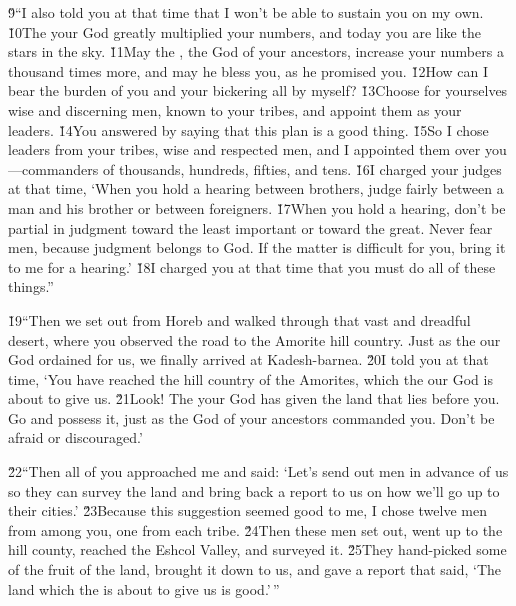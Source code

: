 \v{9}``I also told you at that time that I won't be able to sustain you on my own. \v{10}The  your God greatly multiplied your numbers, and today you are like the stars in the sky. \v{11}May the , the God of your ancestors, increase your numbers a thousand times more, and may he bless you, as he promised you. \v{12}How can I bear the burden of you and your bickering all by myself? \v{13}Choose for yourselves wise and discerning men, known to your tribes, and appoint them as your leaders. \v{14}You answered by saying that this plan is a good thing. \v{15}So I chose leaders from your tribes, wise and respected men, and I appointed them over you---commanders of thousands, hundreds, fifties, and tens. \v{16}I charged your judges at that time, `When you hold a hearing between brothers, judge fairly between a man and his brother or between foreigners. \v{17}When you hold a hearing, don't be partial in judgment toward the least important or toward the great. Never fear men, because judgment belongs to God. If the matter is difficult for you, bring it to me for a hearing.' \v{18}I charged you at that time that you must do all of these things.''

\v{19}``Then we set out from Horeb and walked through that vast and dreadful desert, where you observed the road to the Amorite hill country. Just as the  our God ordained for us, we finally arrived at Kadesh-barnea. \v{20}I told you at that time, `You have reached the hill country of the Amorites, which the  our God is about to give us. \v{21}Look! The  your God has given the land that lies before you. Go and possess it, just as the  God of your ancestors commanded you. Don't be afraid or discouraged.'

\v{22}``Then all of you approached me and said: `Let's send out men in advance of us so they can survey the land and bring back a report to us on how we'll go up to their cities.' \v{23}Because this suggestion seemed good to me, I chose twelve men from among you, one from each tribe. \v{24}Then these men set out, went up to the hill county, reached the Eshcol Valley, and surveyed it. \v{25}They hand-picked some of the fruit of the land, brought it down to us, and gave a report that said, `The land which the  is about to give us is good.'\,''

